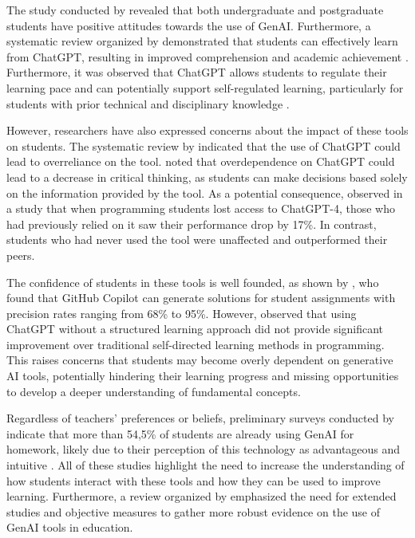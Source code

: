 \documentclass[a4paper,twoside]{article}
\begin{document}
The study conducted by \cite{chan23} revealed that both undergraduate and
postgraduate students have positive attitudes towards the use of GenAI.
Furthermore, a systematic review organized by \cite{Lo24} demonstrated that
students can effectively learn from ChatGPT, resulting in improved comprehension
and academic achievement \citep{Callejo24}. Furthermore, it was observed that
ChatGPT allows students to regulate their learning pace \citep{Baha24} and can
potentially support self-regulated learning, particularly for students with
prior technical and disciplinary knowledge \citep{Xia23}.

However, researchers have also expressed concerns about the impact of these
tools on students. The systematic review by \cite{Murillo23} indicated that the
use of ChatGPT could lead to overreliance on the tool. \cite{chan23} noted that
overdependence on ChatGPT could lead to a decrease in critical thinking, as
students can make decisions based solely on the information provided by the tool.
As a potential consequence, \cite{Eason23} observed in a study that when
programming students lost access to ChatGPT-4, those who had previously relied
on it saw their performance drop by 17\%. In contrast, students who had never
used the tool were unaffected and outperformed their peers.

The confidence of students in these tools is well founded, as shown by
\cite{Puryear22}, who found that GitHub Copilot can generate solutions for
student assignments with precision rates ranging from 68\% to 95\%. However,
\cite{Boudouaia24} observed that using ChatGPT without a structured learning
approach did not provide significant improvement over traditional self-directed
learning methods in programming. This raises concerns that students may become
overly dependent on generative AI tools, potentially hindering their learning
progress and missing opportunities to develop a deeper understanding of
fundamental concepts.

Regardless of teachers' preferences or beliefs, preliminary surveys conducted
by \cite{Dickey24} indicate that more than 54,5\% of students are already using
GenAI for homework, likely due to their perception of this technology as
advantageous and intuitive \citep{Boudouaia24}. All of these studies highlight
the need to increase the understanding of how students interact with these tools
and how they can be used to improve learning. Furthermore, a review organized by
\cite{Lo24} emphasized the need for extended studies and objective measures to
gather more robust evidence on the use of GenAI tools in education.
\end{document}
